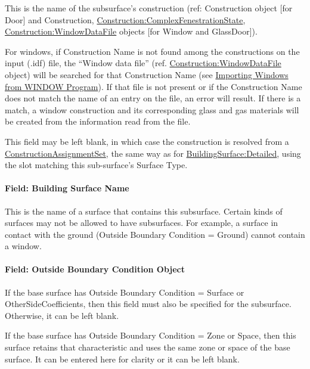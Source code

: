 This is the name of the subsurface's construction (ref: Construction object {[}for Door{]} and Construction, \hyperref[constructioncomplexfenestrationstate]{Construction:ComplexFenestrationState}, \hyperref[constructionwindowdatafile]{Construction:WindowDataFile} objects {[}for Window and GlassDoor{]}).

For windows, if Construction Name is not found among the constructions on the input (.idf) file, the ``Window data file'' (ref. \hyperref[constructionwindowdatafile]{Construction:WindowDataFile} object) will be searched for that Construction Name (see \hyperref[importing-windows-from-window-program]{Importing Windows from WINDOW Program}). If that file is not present or if the Construction Name does not match the name of an entry on the file, an error will result. If there is a match, a window construction and its corresponding glass and gas materials will be created from the information read from the file.

This field may be left blank, in which case the construction is resolved from a \hyperref[constructionassignmentset]{ConstructionAssignmentSet}, the same way as for \hyperref[buildingsurfacedetailed]{BuildingSurface:Detailed}, using the slot matching this sub-surface's Surface Type.

\paragraph{Field: Building Surface Name}\label{field-building-surface-name-6}

This is the name of a surface that contains this subsurface. Certain kinds of surfaces may not be allowed to have subsurfaces. For example, a surface in contact with the ground (Outside Boundary Condition = Ground) cannot contain a window.

\paragraph{Field: Outside Boundary Condition Object}\label{field-outside-boundary-condition-object-10}

If the base surface has Outside Boundary Condition = Surface or OtherSideCoefficients, then this field must also be specified for the subsurface. Otherwise, it can be left blank.

If the base surface has Outside Boundary Condition = Zone or Space, then this surface retains that characteristic and uses the same zone or space of the base surface. It can be entered here for clarity or it can be left blank.

